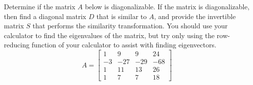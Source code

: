 Determine if the matrix $A$ below is diagonalizable.  If the matrix is diagonalizable, then find a diagonal matrix $D$ that is similar to $A$, and provide the invertible matrix $S$ that performs the similarity transformation.  You should use your calculator to find the eigenvalues of the matrix, but try only using the row-reducing function of your calculator to assist with finding eigenvectors.
%
\begin{equation*}
A=
\begin{bmatrix}
1 & 9 & 9 & 24 \\
 -3 & -27 & -29 & -68 \\
 1 & 11 & 13 & 26 \\
 1 & 7 & 7 & 18
\end{bmatrix}
\end{equation*}
%